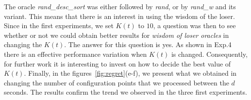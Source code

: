 \documentclass[10pt, conference, compsocconf]{IEEEtran}
\begin{document}
The oracle {\it rand\_desc\_sort} was either followed by {\it rand}, or by {\it rand\_w} and its variant. 
This means that there is an interest in using the wisdom of the loser. Since in the first experiments, 
we set $K(t)$ to $10$, a question was then to see whether or not we could obtain better 
results for {\it wisdom of loser oracles} in changing the $K(t)$.  The answer for this question is yes. 
As shown in {\small Exp.4} there is an effective 
performance variation when $K(t)$ is changed. Consequently, for further work it is interesting to invest on how to 
decide the best value of $K(t)$. Finally, in the figures~\ref{fig:regret}(e-f), we present what we obtained in changing 
the number of configuration points that we processed between the $d$ seconds. The results confirm the trend we observed 
in the three first experiments. 
\end{document}

